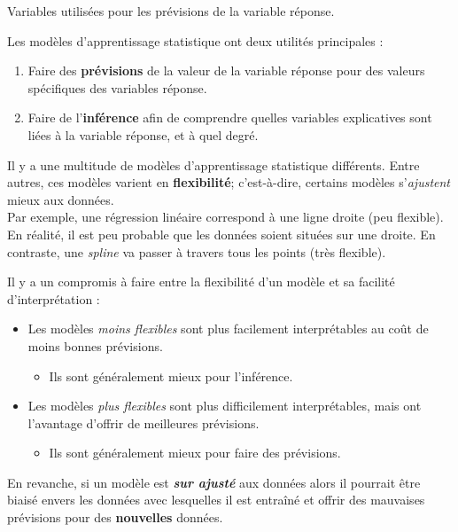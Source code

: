 \documentclass[10pt, french]{article}
\begin{document}
\begin{multicols*}{2}
\begin{definitionNOHFILLsub}
Variables utilisées pour les prévisions de la variable réponse.
\end{definitionNOHFILLsub}

Les modèles d'apprentissage statistique ont deux utilités principales : 
\begin{enumerate}[label	=	\circled{\arabic*}{lightgray}]
	\item	Faire des \textbf{prévisions} de la valeur de la variable réponse pour des valeurs spécifiques des variables réponse.
	\item	Faire de l'\textbf{inférence} afin de comprendre quelles variables explicatives sont liées à la variable réponse, et à quel degré.
\end{enumerate}

Il y a une multitude de modèles d'apprentissage statistique différents. Entre autres, ces modèles varient en \textbf{flexibilité}; c'est-à-dire, certains modèles s'\textit{ajustent} mieux aux données.\\

Par exemple, une régression linéaire correspond à une ligne droite (peu flexible). En réalité, il est peu probable que les données soient situées sur une droite. En contraste, une \og \textit{spline} \fg{} va passer à travers tous les points (très flexible).


\begin{definitionNOHFILLprop}
Il y a un compromis à faire entre la flexibilité d'un modèle et sa facilité d'interprétation :
\begin{itemize}
	\item	Les modèles \textit{moins flexibles} sont plus facilement interprétables au coût de moins bonnes prévisions. 
		\begin{itemize}
		\item	Ils sont généralement mieux pour l'inférence. 
		\end{itemize}
	\item	Les modèles \textit{plus flexibles} sont plus difficilement interprétables, mais ont l'avantage d'offrir de meilleures prévisions. 
		\begin{itemize}
		\item	Ils sont généralement mieux pour faire des prévisions.
		\end{itemize}
\end{itemize}

En revanche, si un modèle est \textit{\textbf{sur ajusté}} aux données alors il pourrait être biaisé envers les données avec lesquelles il est entraîné et offrir des mauvaises prévisions pour des \textbf{nouvelles} données.
\end{definitionNOHFILLprop}


\end{multicols*}
\end{document}
